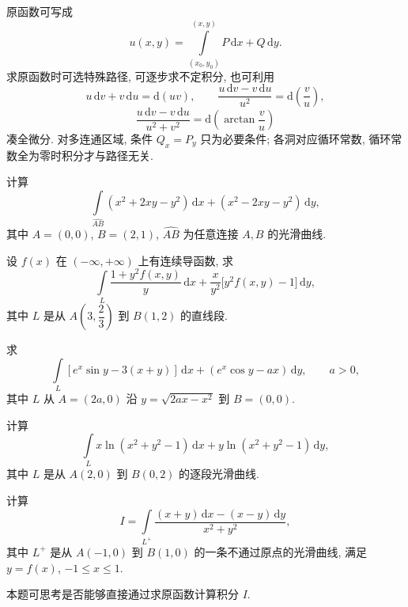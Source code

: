 \documentclass[../数学分析培优讲义.tex]{subfiles}
\begin{document}
\begin{remark}
原函数可写成
\[
    u(x,y)=\int\limits_{(x_0,y_0)}^{(x,y)}P\,\mathrm{d}x+Q\,\mathrm{d}y.
\]
求原函数时可选特殊路径, 可逐步求不定积分, 也可利用
\[
    u\,\mathrm{d}v+v\,\mathrm{d}u=\mathrm{d}(uv),
    \qquad
    \dfrac{u\,\mathrm{d}v-v\,\mathrm{d}u}{u^2}=\mathrm{d}\left(\dfrac{v}{u}\right),
\]
\[
    \dfrac{u\,\mathrm{d}v-v\,\mathrm{d}u}{u^2+v^2}=\mathrm{d}\left(\arctan\dfrac{v}{u}\right)
\]
凑全微分. 对多连通区域, 条件 $Q_x=P_y$ 只为必要条件; 各洞对应循环常数, 循环常数全为零时积分才与路径无关.
\end{remark}

\begin{example}
计算
\[
    \int\limits_{\widehat{AB}}(x^2+2xy-y^2)\,\mathrm{d}x+(x^2-2xy-y^2)\,\mathrm{d}y,
\]
其中 $A=(0,0)$, $B=(2,1)$, $\widehat{AB}$ 为任意连接 $A,B$ 的光滑曲线.
\end{example}
\exampleblank

\begin{example}
设 $f(x)$ 在 $(-\infty,+\infty)$ 上有连续导函数, 求
\[
    \int\limits_L
    \dfrac{1+y^2f(x,y)}{y}\,\mathrm{d}x
    +\dfrac{x}{y^2}\bigl\lbrack y^2f(x,y)-1\bigr\rbrack\,\mathrm{d}y,
\]
其中 $L$ 是从 $A(3,\dfrac{2}{3})$ 到 $B(1,2)$ 的直线段.
\end{example}
\exampleblank

\begin{example}
求
\[
    \int\limits_L[ e^x\sin y-3(x+y)]\,\mathrm{d}x+(e^x\cos y-ax)\,\mathrm{d}y,
    \qquad a>0,
\]
其中 $L$ 从 $A=(2a,0)$ 沿 $y=\sqrt{2ax-x^2}$ 到 $B=(0,0)$.
\end{example}
\exampleblank

\begin{example}
计算
\[
    \int\limits_Lx\ln(x^2+y^2-1)\,\mathrm{d}x+y\ln(x^2+y^2-1)\,\mathrm{d}y,
\]
其中 $L$ 是从 $A(2,0)$ 到 $B(0,2)$ 的逐段光滑曲线.
\end{example}
\exampleblank

\begin{example}
计算
\[
    I=\int\limits_{L^+}\dfrac{(x+y)\,\mathrm{d}x-(x-y)\,\mathrm{d}y}{x^2+y^2},
\]
其中 $L^+$ 是从 $A(-1,0)$ 到 $B(1,0)$ 的一条不通过原点的光滑曲线, 满足 $y=f(x)$, $-1\leq x\leq1$.
\end{example}
\exampleblank

\begin{remark}
本题可思考是否能够直接通过求原函数计算积分 $I$.
\end{remark}
\end{document}

